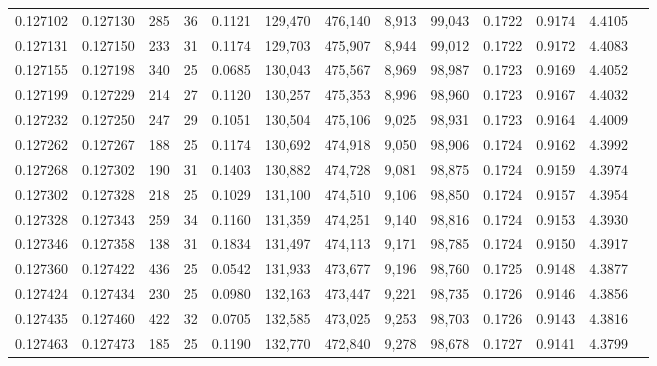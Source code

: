 \begin{tabular}{rrrrrrrrrrrrr}
0.127102 & 0.127130 &   285 &  36 &                                     0.1121 & 129,470 & 476,140 &   8,913 &  99,043 & 0.1722 & 0.9174 & 4.4105 \\
0.127131 & 0.127150 &   233 &  31 &                                     0.1174 & 129,703 & 475,907 &   8,944 &  99,012 & 0.1722 & 0.9172 & 4.4083 \\
0.127155 & 0.127198 &   340 &  25 &                                     0.0685 & 130,043 & 475,567 &   8,969 &  98,987 & 0.1723 & 0.9169 & 4.4052 \\
0.127199 & 0.127229 &   214 &  27 &                                     0.1120 & 130,257 & 475,353 &   8,996 &  98,960 & 0.1723 & 0.9167 & 4.4032 \\
0.127232 & 0.127250 &   247 &  29 &                                     0.1051 & 130,504 & 475,106 &   9,025 &  98,931 & 0.1723 & 0.9164 & 4.4009 \\
0.127262 & 0.127267 &   188 &  25 &                                     0.1174 & 130,692 & 474,918 &   9,050 &  98,906 & 0.1724 & 0.9162 & 4.3992 \\
0.127268 & 0.127302 &   190 &  31 &                                     0.1403 & 130,882 & 474,728 &   9,081 &  98,875 & 0.1724 & 0.9159 & 4.3974 \\
0.127302 & 0.127328 &   218 &  25 &                                     0.1029 & 131,100 & 474,510 &   9,106 &  98,850 & 0.1724 & 0.9157 & 4.3954 \\
0.127328 & 0.127343 &   259 &  34 &                                     0.1160 & 131,359 & 474,251 &   9,140 &  98,816 & 0.1724 & 0.9153 & 4.3930 \\
0.127346 & 0.127358 &   138 &  31 &                                     0.1834 & 131,497 & 474,113 &   9,171 &  98,785 & 0.1724 & 0.9150 & 4.3917 \\
0.127360 & 0.127422 &   436 &  25 &                                     0.0542 & 131,933 & 473,677 &   9,196 &  98,760 & 0.1725 & 0.9148 & 4.3877 \\
0.127424 & 0.127434 &   230 &  25 &                                     0.0980 & 132,163 & 473,447 &   9,221 &  98,735 & 0.1726 & 0.9146 & 4.3856 \\
0.127435 & 0.127460 &   422 &  32 &                                     0.0705 & 132,585 & 473,025 &   9,253 &  98,703 & 0.1726 & 0.9143 & 4.3816 \\
0.127463 & 0.127473 &   185 &  25 &                                     0.1190 & 132,770 & 472,840 &   9,278 &  98,678 & 0.1727 & 0.9141 & 4.3799 \\

\end{tabular}

